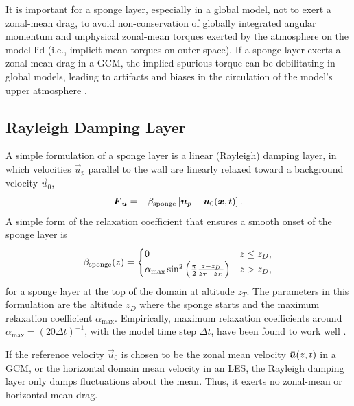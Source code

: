 \documentclass{report}
\begin{document}
It is important for a sponge layer, especially in a global model, not to exert a zonal-mean drag, to avoid non-conservation of globally integrated angular momentum and unphysical zonal-mean torques exerted by the atmosphere on the model lid (i.e., implicit mean torques on outer space). If a sponge layer exerts a zonal-mean drag in a GCM, the implied spurious torque can be debilitating in global models, leading to artifacts and biases in the circulation of the model's upper atmosphere \citep[e.g.,][]{Shepherd96a}. 

\subsection{Rayleigh Damping Layer}

A simple formulation of a sponge layer is a linear (Rayleigh) damping layer, in which velocities $\vec{u}_p$ parallel to the wall are linearly relaxed toward a background velocity $\vec{u}_0$,
\begin{equation*}
\vec{F}_{\vec{u}} = -\beta_{\rm sponge} \left[\vec{u}_p - \vec{u}_0(\vec{x}, t)\right].
\end{equation*}
A simple form of the relaxation coefficient that ensures a smooth onset of the sponge layer is \citep{klemp:1978a}
\begin{equation}\label{eq:spongeDurran}
\beta_{\rm sponge}(z) =  
  \begin{cases}
    0 &  z\leq z_D,\\
    \alpha_{\max} \sin^2 \left( \frac{\pi}{2}\frac{z - z_D}{z_T - z_D} \right) & z > z_D,
    \end{cases}
\end{equation}
for a sponge layer at the top of the domain at altitude $z_T$. The parameters in this formulation are the altitude $z_D$ where the sponge starts and the maximum relaxation coefficient $\alpha_{\max}$. Empirically, maximum relaxation coefficients around $\alpha_{\max} = (20 \Delta t)^{-1}$, with the model time step $\Delta t$, have been found to work well \citep{Jablonowski11a}.

If the reference velocity $\vec{u}_0$ is chosen to be the zonal mean velocity $\vec{\Bar u}(z, t)$ in a GCM, or the horizontal domain mean velocity in an LES, the Rayleigh damping layer only damps fluctuations about the mean. Thus, it exerts no zonal-mean or horizontal-mean drag.  
\end{document}
